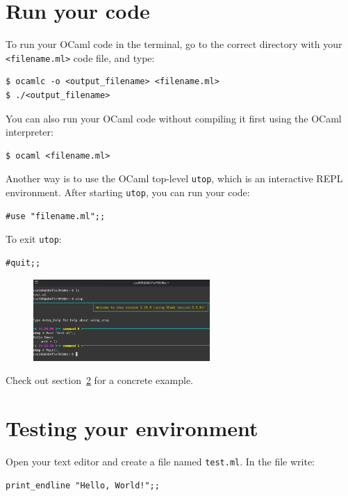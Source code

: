 \documentclass{extarticle}
\begin{document}
\newpage
\section{Run your code}\label{CompileRun}
To run your OCaml code in the terminal, go to the correct directory with your \texttt{<filename.ml>} code file, and type:
\begin{lstlisting}
$ ocamlc -o <output_filename> <filename.ml>
$ ./<output_filename>
\end{lstlisting}

You can also run your OCaml code without compiling it first using the OCaml interpreter:
\begin{lstlisting}
$ ocaml <filename.ml>
\end{lstlisting}

Another way is to use the OCaml top-level \texttt{utop}, which is an interactive REPL environment.
After starting \texttt{utop}, you can run your code:
\begin{lstlisting}
#use "filename.ml";;
\end{lstlisting}
To exit \texttt{utop}:
\begin{lstlisting}
#quit;;
\end{lstlisting}
\begin{figure}[H]
  \centering
  \includegraphics[width=0.6\textwidth]{utop_run_code.png}
\end{figure}
Check out section~\ref{TestEnv} for a concrete example.


\newpage
\section{Testing your environment}\label{TestEnv}
Open your text editor and create a file named \texttt{test.ml}. In the file write:
\begin{lstlisting}
print_endline "Hello, World!";;
\end{lstlisting}
\end{document}
